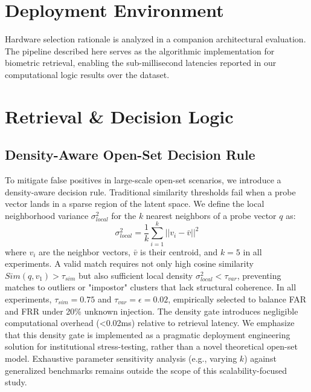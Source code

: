 \documentclass[conference]{IEEEtran}
\begin{document}
\section{Deployment Environment}

Hardware selection rationale is analyzed in a companion architectural evaluation. The pipeline described here serves as the algorithmic implementation for biometric retrieval, enabling the sub-millisecond latencies reported in our computational logic results over the dataset.

\section{Retrieval \& Decision Logic}

\subsection{Density-Aware Open-Set Decision Rule}

To mitigate false positives in large-scale open-set scenarios, we introduce a density-aware decision rule. Traditional similarity thresholds fail when a probe vector lands in a sparse region of the latent space. We define the local neighborhood variance $\sigma^2_{local}$ for the $k$ nearest neighbors of a probe vector $q$ as:
\begin{equation}
\sigma^2_{local} = \frac{1}{k} \sum_{i=1}^{k} ||v_i - \bar{v}||^2
\end{equation}
where $v_i$ are the neighbor vectors, $\bar{v}$ is their centroid, and $k=5$ in all experiments. A valid match requires not only high cosine similarity $Sim(q, v_{1}) > \tau_{sim}$ but also sufficient local density $\sigma^2_{local} < \tau_{var}$, preventing matches to outliers or "impostor" clusters that lack structural coherence. In all experiments, $\tau_{sim}=0.75$ and $\tau_{var}=\epsilon=0.02$, empirically selected to balance FAR and FRR under 20\% unknown injection. The density gate introduces negligible computational overhead (<0.02ms) relative to retrieval latency. We emphasize that this density gate is implemented as a pragmatic deployment engineering solution for institutional stress-testing, rather than a novel theoretical open-set model. Exhaustive parameter sensitivity analysis (e.g., varying $k$) against generalized benchmarks remains outside the scope of this scalability-focused study.
\end{document}
